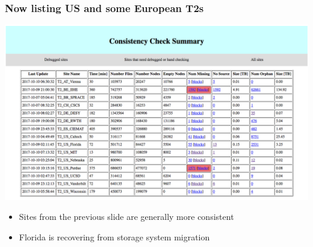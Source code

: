\documentclass{beamer}
\begin{document}
\begin{frame}
  \frametitle{Now listing US and some European T2s}

  \includegraphics[width=\linewidth]{new_screenshot.png}

  \begin{itemize}
  \item Sites from the previous slide are generally more consistent
  \item Florida is recovering from storage system migration
  \end{itemize}

\end{frame}
\end{document}
